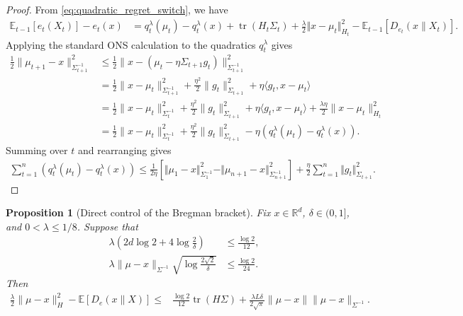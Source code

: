 \documentclass{article}
\theoremstyle{plain}
\newtheorem{proposition}[theorem]{Proposition}
\theoremstyle{definition}
\theoremstyle{plain}
\newcommand{\R}{\mathbb R}
\newcommand{\tr}{\operatorname{tr}}
\newcommand{\norm}[1]{\Vert #1 \Vert}
\newcommand{\E}{\mathbb E}
\begin{document}
\begin{proof}
    From \cref{eq:quadratic_regret_switch}, we have
    \begin{align}
        \E_{t-1}[e_t(X_t)]-e_t(x)
         & =
        q_t^\lambda(\mu_t)-q_t^\lambda(x)
        +\tr(H_t\Sigma_t)
        +\frac{\lambda}{2}\norm{x-\mu_t}_{H_t}^2
        - \E_{t-1}[D_{e_t}(x\|X_t)].
    \end{align}
    Applying the standard ONS calculation to the quadratics $q_t^\lambda$ gives
    \begin{align}
        \frac12 \|\mu_{t+1}-x\|_{\Sigma_{t+1}^{-1}}^2
         & \leq
        \frac12 \|x - (\mu_t - \eta \Sigma_{t+1} g_t)\|_{\Sigma_{t+1}^{-1}}^2
        \\
         & =
        \frac12 \|x - \mu_t\|_{\Sigma_{t+1}^{-1}}^2
        + \frac{\eta^2}{2}\|g_t\|_{\Sigma_{t+1}}^2
        + \eta \langle g_t, x - \mu_t\rangle
        \\
         & =
        \frac12 \|x - \mu_t\|_{\Sigma_{t}^{-1}}^2
        + \frac{\eta^2}{2}\|g_t\|_{\Sigma_{t+1}}^2
        + \eta \langle g_t, x - \mu_t\rangle
        + \frac{\lambda \eta}{2}\|x - \mu_t\|_{H_t}^2
        \\
         & =
        \frac12 \|x - \mu_t\|_{\Sigma_{t}^{-1}}^2
        + \frac{\eta^2}{2}\|g_t\|_{\Sigma_{t+1}}^2
        - \eta \left(q_t^\lambda(\mu_t)-q_t^\lambda(x)\right) .\label{eq:alternative-form}
    \end{align}
    Summing over $t$ and rearranging gives
    \begin{align}
        \sum_{t=1}^n\left(q_t^\lambda(\mu_t)-q_t^\lambda(x)\right)
        \leq
        \frac{1}{2\eta}
        \left[
        \norm{\mu_1-x}_{\Sigma_1^{-1}}^2
        - \norm{\mu_{n+1}-x}_{\Sigma_{n+1}^{-1}}^2
        \right]
        +\frac{\eta}{2}\sum_{t=1}^n\norm{g_t}_{\Sigma_{t+1}}^2 .
        \label{eq:hermite-ons:qreg}
    \end{align}
\end{proof}
\begin{proposition}[Direct control of the Bregman bracket]
    \label{prop:hermite-ons:bracket}
    Fix $x\in\R^d$, $\delta\in(0,1]$, and $0<\lambda\leq1/8$.
    Suppose that
    \begin{align}
        \lambda
        \left(
        2d\log 2+4\log\frac{2}{\delta}
        \right)
         & \leq \frac{\log 2}{12},
        \label{eq:hermite-ons:bracket-dimension}
        \\
        \lambda
        \|\mu-x\|_{\Sigma^{-1}}
        \sqrt{\log\frac{2\sqrt{2}}{\delta}}
         & \leq \frac{\log 2}{24}.
        \label{eq:hermite-ons:bracket-focus}
    \end{align}
    Then
    \begin{align}
        \frac{\lambda}{2}\|\mu-x\|_H^2
        -\E[D_e(x\|X)]
        \leq &
        \frac{\log 2}{12}
        \tr(H\Sigma)
        +
        \frac{\lambda L\delta}{2\sqrt{\pi}}
        \|\mu-x\|
        \|\mu-x\|_{\Sigma^{-1}}.
        \label{eq:hermite-ons:bracket}
    \end{align}
\end{proposition}
\end{document}
